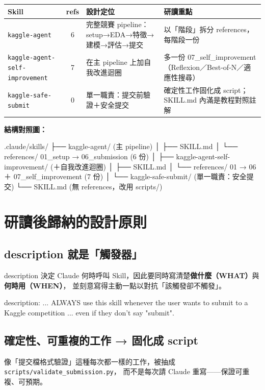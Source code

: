 \documentclass[11pt]{ctexart}
\newenvironment{codebox}
  {\begin{shaded}\ttfamily\small\setlength{\parindent}{0pt}\obeylines}
  {\end{shaded}}
\newcommand{\code}[1]{\texttt{#1}}
\begin{document}
\vspace{0.4em}
\noindent\begin{tabularx}{\linewidth}{l c X X}
\arrayrulecolor{navy}\toprule
\rowcolor{headfill}\textbf{Skill} & \textbf{refs} & \textbf{設計定位} & \textbf{研讀重點} \\
\midrule
\code{kaggle-agent} & 6 & 完整競賽 pipeline：setup→EDA→特徵→建模→評估→提交 & 以「階段」拆分 references，每階段一份 \\
\rowcolor{rowfill}
\code{kaggle-agent-self-improvement} & 7 & 在主 pipeline 上加自我改進迴圈 & 多一份 07\_self\_improvement（Reflexion／Best-of-N／適應性搜尋） \\
\code{kaggle-safe-submit} & 0 & 單一職責：提交前驗證＋安全提交 & 確定性工作固化成 script；SKILL.md 內滿是教程對照註解 \\
\bottomrule
\end{tabularx}

\vspace{0.8em}
\noindent\textbf{結構對照圖：}
\begin{codebox}
.claude/skills/
├── kaggle-agent/                    (主 pipeline)
│   ├── SKILL.md
│   └── references/  01_setup → 06_submission   (6 份)
│
├── kaggle-agent-self-improvement/   (＋自我改進迴圈)
│   ├── SKILL.md
│   └── references/  01 → 06 ＋ 07_self_improvement (7 份)
│
└── kaggle-safe-submit/              (單一職責：安全提交)
    └── SKILL.md   (無 references，改用 scripts/)
\end{codebox}

\section{研讀後歸納的設計原則}

\subsection{description 就是「觸發器」}
description 決定 Claude 何時呼叫 Skill，因此要同時寫清楚\textbf{做什麼（WHAT）}與\textbf{何時用（WHEN）}，
並刻意寫得主動一點以對抗「該觸發卻不觸發」。
\begin{codebox}
description: ... ALWAYS use this skill whenever the user wants to
submit to a Kaggle competition ... even if they don't say "submit".
\end{codebox}

\subsection{確定性、可重複的工作 → 固化成 script}
像「提交檔格式驗證」這種每次都一樣的工作，被抽成 \code{scripts/validate\_submission.py}，
而不是每次請 Claude 重寫——保證可重複、可預期。
\end{document}
